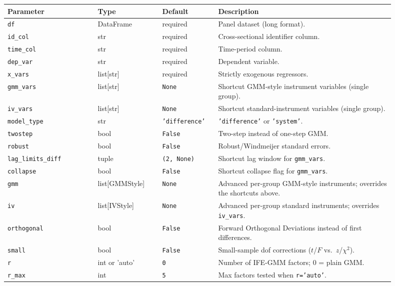 \documentclass[11pt,a4paper]{article}
\begin{document}
\begin{longtable}{@{}p{0.21\linewidth}p{0.15\linewidth}p{0.13\linewidth}p{0.41\linewidth}@{}}
\toprule
\textbf{Parameter} & \textbf{Type} & \textbf{Default} & \textbf{Description} \\
\midrule
\endhead
\texttt{df} & DataFrame & required & Panel dataset (long format). \\
\texttt{id\_col} & str & required & Cross-sectional identifier column. \\
\texttt{time\_col} & str & required & Time-period column. \\
\texttt{dep\_var} & str & required & Dependent variable. \\
\texttt{x\_vars} & list[str] & required & Strictly exogenous regressors. \\
\texttt{gmm\_vars} & list[str] & \texttt{None} & Shortcut GMM-style
  instrument variables (single group). \\
\texttt{iv\_vars} & list[str] & \texttt{None} & Shortcut standard-instrument
  variables (single group). \\
\texttt{model\_type} & str & \texttt{'difference'} & \texttt{'difference'}
  or \texttt{'system'}. \\
\texttt{twostep} & bool & \texttt{False} & Two-step instead of one-step GMM. \\
\texttt{robust} & bool & \texttt{False} & Robust/Windmeijer standard errors. \\
\texttt{lag\_limits\_diff} & tuple & \texttt{(2, None)} & Shortcut lag window
  for \texttt{gmm\_vars}. \\
\texttt{collapse} & bool & \texttt{False} & Shortcut collapse flag for
  \texttt{gmm\_vars}. \\
\texttt{gmm} & list[GMMStyle] & \texttt{None} & Advanced per-group GMM-style
  instruments; overrides the shortcuts above. \\
\texttt{iv} & list[IVStyle] & \texttt{None} & Advanced per-group standard
  instruments; overrides \texttt{iv\_vars}. \\
\texttt{orthogonal} & bool & \texttt{False} & Forward Orthogonal Deviations
  instead of first differences. \\
\texttt{small} & bool & \texttt{False} & Small-sample dof corrections
  ($t$/$F$ vs.\ $z$/$\chi^2$). \\
\texttt{r} & int or 'auto' & \texttt{0} & Number of IFE-GMM factors; 0 =
  plain GMM. \\
\texttt{r\_max} & int & \texttt{5} & Max factors tested when
  \texttt{r='auto'}. \\

\end{longtable}
\end{document}
